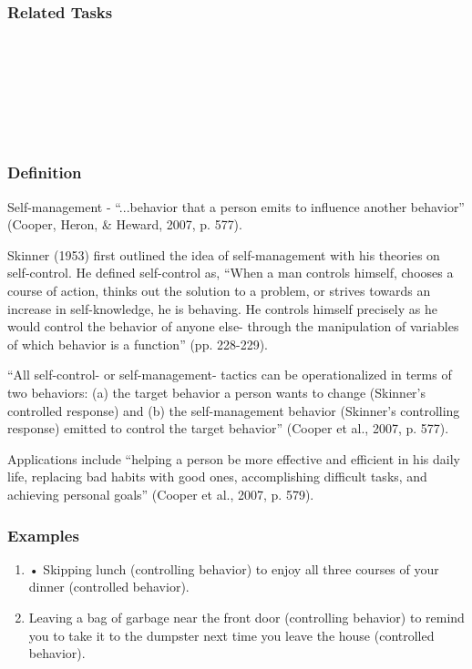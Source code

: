 \subsection{Related Tasks}
\fourdThree{}\\
\fourdEight{}\\
\foureTwo{}\\
\foureSix{}\\
\foureTwelve{}\\
%
%
%
%
%
%
%
%
%
%
%
%
%
%
\chapter{\foursecf{}}
\section{\fourfOne{}}
\subsection{Definition}
Self-management - ``...behavior that a person emits to influence another behavior'' (Cooper, Heron, \& Heward, 2007, p. 577).

Skinner (1953) first outlined the idea of self-management with his theories on self-control. He defined self-control as, ``When a man controls himself, chooses a course of action, thinks out the solution to a problem, or strives towards an increase in self-knowledge, he is behaving. He controls himself precisely as he would control the behavior of anyone else- through the manipulation of variables of which behavior is a function'' (pp. 228-229).

``All self-control- or self-management- tactics can be operationalized in terms of two behaviors: (a) the target behavior a person wants to change (Skinner's controlled response) and (b) the self-management behavior (Skinner's controlling response) emitted to control the target behavior'' (Cooper et al., 2007, p. 577).

Applications include ``helping a person be more effective and efficient in his daily life, replacing bad habits with good ones, accomplishing difficult tasks, and achieving personal goals'' (Cooper et al., 2007, p. 579).
%
\subsection{Examples}
\begin{enumerate}
\item     • Skipping lunch (controlling behavior) to enjoy all three courses of your dinner (controlled behavior).
\item Leaving a bag of garbage near the front door (controlling behavior) to remind you to take it to the dumpster next time you leave the house (controlled behavior).
%
\end{enumerate}
%
